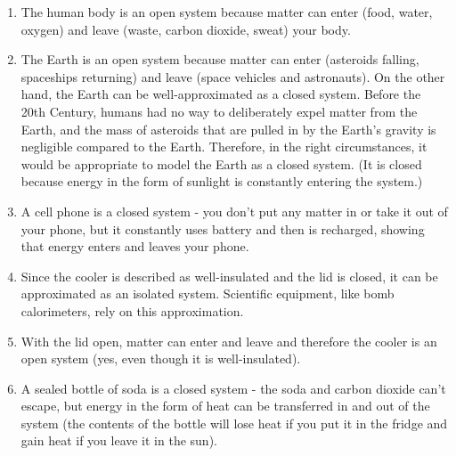 \begin{Answer}[ref = systems]
\begin{enumerate}
\item The human body is an open system because matter can enter (food, water, 
oxygen) and leave (waste, carbon dioxide, sweat) your body.
\item The Earth is an open system because matter can enter (asteroids falling, 
spaceships returning) and leave (space vehicles and astronauts). On the other 
hand, the Earth can be well-approximated as a closed system. Before the 20th 
Century, humans had no way to deliberately expel matter from the Earth, and the 
mass of asteroids that are pulled in by the Earth's gravity is negligible 
compared to the Earth. Therefore, in the right circumstances, it would be 
appropriate to model the Earth as a closed system. (It is closed because 
energy in the form of sunlight is constantly entering the system.)
\item A cell phone is a closed system - you don't put any matter in or take it 
out of your phone, but it constantly uses battery and then is recharged, showing
that energy enters and leaves your phone. 
\item Since the cooler is described as well-insulated and the lid is closed, it 
can be approximated as an isolated system. Scientific equipment, like bomb 
calorimeters, rely on this approximation. 
\item With the lid open, matter can enter and leave and therefore the cooler is 
an open system (yes, even though it is well-insulated). 
\item A sealed bottle of soda is a closed system - the soda and carbon dioxide 
can't escape, but energy in the form of heat can be transferred in and out of 
the system (the contents of the bottle will lose heat if you put it in the 
fridge and gain heat if you leave it in the sun).
\end{enumerate}
\end{Answer}